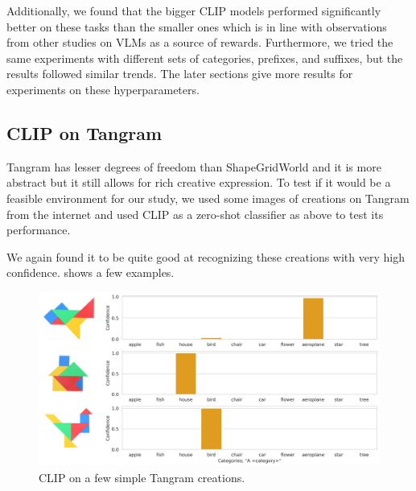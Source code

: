 Additionally, we found that the bigger CLIP models performed significantly better on these tasks than the smaller ones which is in line with observations from other studies on VLMs as a source of rewards.
Furthermore, we tried the same experiments with different sets of categories, prefixes, and suffixes, but the results followed similar trends.
The later sections give more results for experiments on these hyperparameters.


\subsection{CLIP on Tangram}
\label{sec:clip-tangram}

Tangram has lesser degrees of freedom than ShapeGridWorld and it is more abstract but it still allows for rich creative expression.
To test if it would be a feasible environment for our study, we used some images of creations on Tangram from the internet and used CLIP as a zero-shot classifier as above to test its performance.

We again found it to be quite good at recognizing these creations with very high confidence.
 shows a few examples.
\begin{figure}[H]
    \centering
    \includegraphics[width=\textwidth]{images/tangram_comparison_orange.png}
    \caption{CLIP on a few simple Tangram creations.}
    \label{fig:clip-tangram}
\end{figure}

